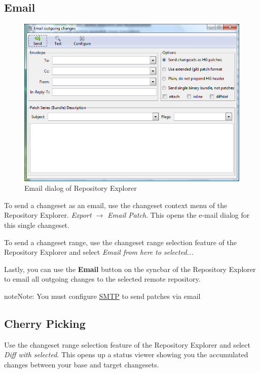 \documentclass[letterpaper,10pt,english]{manual}
\begin{document}
\subsection{Email}
\begin{figure}[htbp]
\centering

\includegraphics{email.png}
\caption{Email dialog of Repository Explorer}\end{figure}

To send a changeset as an email, use the changeset context menu of the
Repository Explorer. \emph{Export \(\rightarrow\) Email Patch}.  This
opens the e-mail dialog for this single changeset.

To send a changeset range, use the changeset range selection feature of
the Repository Explorer and select
\emph{Email from here to selected...}

Lastly, you can use the \textbf{Email} button on the syncbar of the
Repository Explorer to email all outgoing changes to the selected remote
repository.

\begin{notice}{note}{Note:}
You must configure
\href{http://www.selenic.com/mercurial/hgrc.5.html\#smtp}{SMTP}
to send patches via email
\end{notice}


\subsection{Cherry Picking}

Use the changeset range selection feature of the Repository Explorer and
select \emph{Diff with selected}.  This opens up a status
viewer showing you the accumulated changes between your base and target
changesets.
\end{document}
